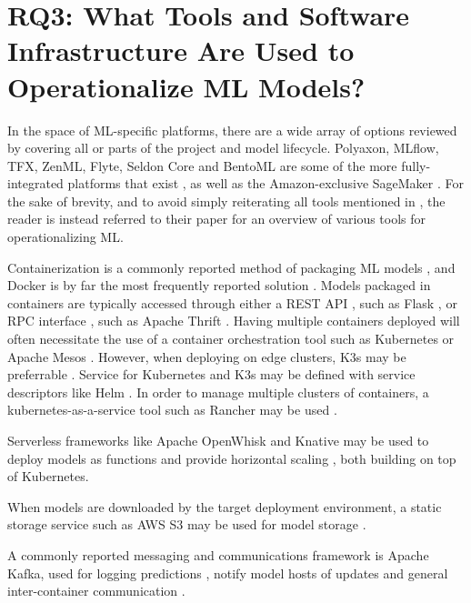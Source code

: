 \section{RQ3: What Tools and Software Infrastructure Are Used to Operationalize ML Models?}
\label{ch:research_results:rq3_tools_infrastructure}
In the space of ML-specific platforms, there are a wide array of options reviewed by \cite{Ruf2021} covering all or parts of the project and model lifecycle.
Polyaxon, MLflow, TFX, ZenML, Flyte, Seldon Core and BentoML are some of the more fully-integrated platforms that exist \cite{Chen2020, Ruf2021}, as well as the Amazon-exclusive SageMaker \cite{Ruf2021, Chahal2020}.
For the sake of brevity, and to avoid simply reiterating all tools mentioned in \cite{Ruf2021}, the reader is instead referred to their paper for an overview of various tools for operationalizing ML.

Containerization is a commonly reported method of packaging ML models \cite{Ruf2021, Peticolas2019, Rausch2019}, and Docker is by far the most frequently reported solution \cite{Krishnamurthi2019, Richins2020, Li2017,Garcia2020,Crankshaw2017, Paeaekkoenen2020,Gupta2020}.
Models packaged in containers are typically accessed through either a REST API \cite{Garcia2020, Paeaekkoenen2020}, such as Flask \cite{Gupta2020}, or RPC interface \cite{Ruf2021, Crankshaw2017}, such as Apache Thrift \cite{Li2017}.
Having multiple containers deployed will often necessitate the use of a container orchestration tool such as Kubernetes \cite{Liu2020, Richins2020, Paeaekkoenen2020, Rausch2019a} or Apache Mesos \cite{Garcia2020}.
However, when deploying on edge clusters, K3s may be preferrable \cite{Paeaekkoenen2020}.
Service for Kubernetes and K3s may be defined with service descriptors like Helm \cite{Paeaekkoenen2020}.
In order to manage multiple clusters of containers, a kubernetes-as-a-service tool such as Rancher may be used \cite{Paeaekkoenen2020}.

Serverless frameworks like Apache OpenWhisk and Knative may be used to deploy models as functions and provide horizontal scaling \cite{Rausch2019a, Garcia2020}, both building on top of Kubernetes.

When models are downloaded by the target deployment environment, a static storage service such as AWS S3 may be used for model storage \cite{Liu2020, Chahal2020}.

A commonly reported messaging and communications framework is Apache Kafka, used for logging predictions \cite{Li2017}, notify model hosts of updates \cite{Liu2020,Garcia2020} and general inter-container communication \cite{Richins2020}.

